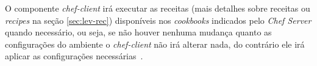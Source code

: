 O componente \textit{chef-client} irá executar as receitas (mais detalhes sobre receitas ou
\textit{recipes} na seção \ref{sec:lev-rec}) disponíveis nos \textit{cookbooks}
indicados pelo \textit{Chef Server} quando necessário, ou seja, se não houver
nenhuma mudança quanto as configurações do ambiente o \textit{chef-client} não irá
alterar nada, do contrário ele irá aplicar as configurações necessárias~\cite{chefdoc:2016}.




